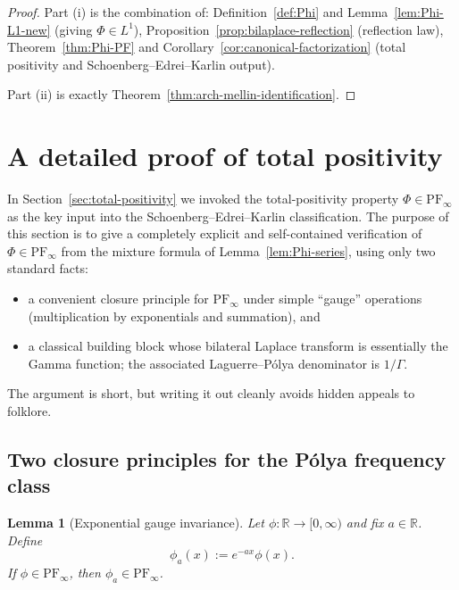 \documentclass[12pt]{amsart}
\newtheorem{lemma}[theorem]{Lemma}
\theoremstyle{definition}
\theoremstyle{remark}
\begin{document}
\begin{proof}
Part (i) is the combination of:
Definition~\ref{def:Phi} and Lemma~\ref{lem:Phi-L1-new} (giving $\Phi\in L^1$),
Proposition~\ref{prop:bilaplace-reflection} (reflection law),
Theorem~\ref{thm:Phi-PF} and Corollary~\ref{cor:canonical-factorization}
(total positivity and Schoenberg--Edrei--Karlin output).

Part (ii) is exactly Theorem~\ref{thm:arch-mellin-identification}.

\end{proof}



\section{A detailed proof of total positivity}
\label{sec:tp-details}

In Section~\ref{sec:total-positivity} we invoked the total-positivity property
$\Phi\in\mathrm{PF}_\infty$ as the key input into the Schoenberg--Edrei--Karlin
classification. The purpose of this section is to give a completely explicit and
self-contained verification of $\Phi\in\mathrm{PF}_\infty$ from the mixture formula
of Lemma~\ref{lem:Phi-series}, using only two standard facts:

\begin{itemize}
\item[(i)] a convenient closure principle for $\mathrm{PF}_\infty$ under simple
``gauge'' operations (multiplication by exponentials and summation), and
\item[(ii)] a classical building block whose bilateral Laplace transform is essentially
the Gamma function; the associated Laguerre--P\'olya denominator is $1/\Gamma$.
\end{itemize}

The argument is short, but writing it out cleanly avoids hidden appeals to folklore.

\subsection{Two closure principles for the P\'olya frequency class}

\begin{lemma}[Exponential gauge invariance]
\label{lem:PF-gauge}
Let $\phi:\mathbb R\to[0,\infty)$ and fix $a\in\mathbb R$. Define
\[
\phi_a(x):=e^{-a x}\phi(x).
\]
If $\phi\in\mathrm{PF}_\infty$, then $\phi_a\in\mathrm{PF}_\infty$.
\end{lemma}
\end{document}
